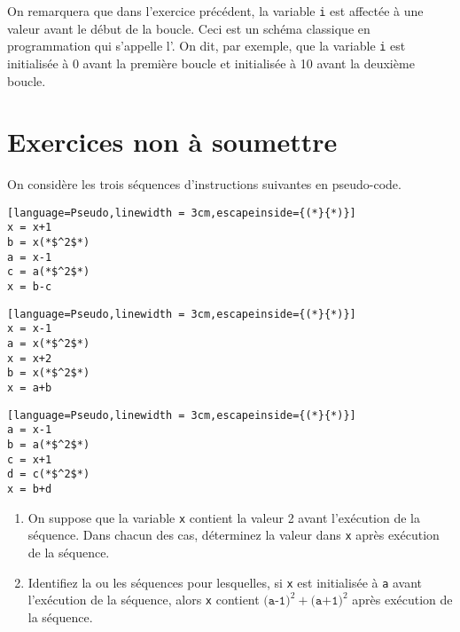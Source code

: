 On remarquera que dans l'exercice précédent, la variable \texttt{i} est affectée à une valeur avant le début de la boucle. Ceci est un schéma classique en programmation qui s'appelle l'. On dit, par exemple, que la variable \texttt{i} est initialisée à 0 avant la première boucle et initialisée à 10 avant la deuxième boucle.

\chapter*{Exercices non à soumettre}

\begin{exercise}
	On considère les trois séquences d'instructions suivantes en pseudo-code.
\begin{center}
	\begin{varwidth}[t]{.5\textwidth}
		\begin{lstlisting}[language=Pseudo,linewidth = 3cm,escapeinside={(*}{*)}]
x = x+1
b = x(*$^2$*)
a = x-1
c = a(*$^2$*)
x = b-c
\end{lstlisting}	
	\end{varwidth}\hspace{2cm}
	\begin{varwidth}[t]{.5\textwidth}
		\begin{lstlisting}[language=Pseudo,linewidth = 3cm,escapeinside={(*}{*)}]
x = x-1
a = x(*$^2$*)
x = x+2
b = x(*$^2$*)
x = a+b
\end{lstlisting}	
	\end{varwidth}\hspace{2cm}
	\begin{varwidth}[t]{.5\textwidth}
	\begin{lstlisting}[language=Pseudo,linewidth = 3cm,escapeinside={(*}{*)}]
a = x-1
b = a(*$^2$*)
c = x+1
d = c(*$^2$*)
x = b+d
\end{lstlisting}	
	\end{varwidth}
\end{center}
\begin{enumerate}
	\item On suppose que la variable \texttt{x} contient la valeur 2 avant l'exécution de la séquence. Dans chacun des cas, déterminez la valeur dans \texttt{x} après exécution de la séquence.
	\item Identifiez la ou les séquences pour lesquelles, si \texttt{x} est initialisée à \texttt{a} avant l'exécution de la séquence, alors \texttt{x} contient $\texttt{(a-1)}^2+\texttt{(a+1)}^2$ après exécution de la séquence.
\end{enumerate}
\end{exercise}

